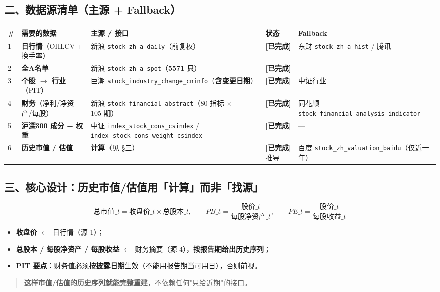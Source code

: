 \documentclass[11pt]{article}
\begin{document}
\subsection{\texorpdfstring{二、数据源清单（主源 + Fallback）}{二、数据源清单（主源 + Fallback）}}
{\small
\begin{longtable}{p{1.20cm}p{2.80cm}p{6.70cm}p{1.20cm}p{4.30cm}}
\toprule
\# & 需要的数据 & 主源 / 接口 & 状态 & Fallback \\
\midrule
1 & \textbf{日行情}（OHLCV + 换手率） & 新浪 \texttt{stock\_zh\_a\_daily}（前复权） & \textbf{[已完成]} & 东财 \texttt{stock\_zh\_a\_hist} / 腾讯 \\
2 & \textbf{全A名单} & 新浪 \texttt{stock\_zh\_a\_spot}（\textbf{5571 只}） & \textbf{[已完成]} & --- \\
3 & \textbf{个股 \ensuremath{\rightarrow} 行业}（PIT） & 巨潮 \texttt{stock\_industry\_change\_cninfo}（\textbf{含变更日期}） & \textbf{[已完成]} & 中证行业 \\
4 & \textbf{财务}（净利/净资产/每股） & 新浪 \texttt{stock\_financial\_abstract}（80 指标 \ensuremath{\times} 105 期） & \textbf{[已完成]} & 同花顺 \texttt{stock\_financial\_analysis\_indicator} \\
5 & \textbf{沪深300 成分 + 权重} & 中证 \texttt{index\_stock\_cons\_csindex} / \texttt{index\_stock\_cons\_weight\_csindex} & \textbf{[已完成]} & --- \\
6 & \textbf{历史市值 / 估值} & \textbf{计算}（见 \S{}三） & \textbf{[已完成]} 推导 & 百度 \texttt{stock\_zh\_valuation\_baidu}（仅近一年） \\
\bottomrule
\end{longtable}
}
\subsection{\texorpdfstring{三、核心设计：历史市值/估值用「计算」而非「找源」}{三、核心设计：历史市值/估值用「计算」而非「找源」}}
$$\text{总市值}\_t=\text{收盘价}\_t\times\text{总股本}\_{t},\qquad
PB\_t=\frac{\text{股价}\_t}{\text{每股净资产}\_{t}},\qquad
PE\_t=\frac{\text{股价}\_t}{\text{每股收益}\_{t}}$$
\begin{itemize}
  \item \textbf{收盘价} \ensuremath{\leftarrow} 日行情（源 1）；
  \item \textbf{总股本 / 每股净资产 / 每股收益} \ensuremath{\leftarrow} 财务摘要（源 4），\textbf{按报告期给出历史序列}；
  \item \textbf{PIT 要点}：财务值必须按\textbf{披露日期}生效（不能用报告期当可用日），否则前视。
\end{itemize}
\begin{quote}
\textbf{这样市值/估值的历史序列就能完整重建}，不依赖任何"只给近期"的接口。
\end{quote}
\end{document}

